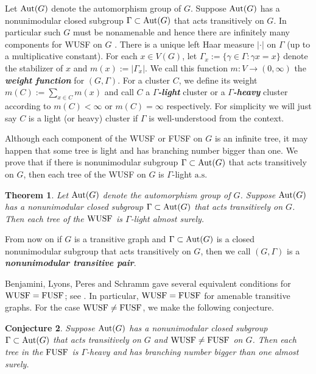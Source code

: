 \documentclass[12pt]{article}
\newtheorem{theorem}{Theorem}[section]
\newtheorem{conj}[theorem]{Conjecture}
\numberwithin{equation}{section}
\def\as {\mathrm{a.s.}}
\newcommand{\1}{\mathbf{1}}
\newcommand{\notion}[1]{{\bf  \textit{#1}}}
\begin{document}
 Let $\textnormal{Aut}(G)$ denote the automorphism group of $G$. Suppose $\textnormal{Aut}(G)$ has a nonunimodular closed subgroup $\Gamma\subset \textnormal{Aut}(G)$ that acts transitively on $G$. In particular such $G$ must be nonamenable \cite[Proposition 8.14]{LP2016} and hence there are infinitely many components for WUSF on $G$ \cite[Corollary 10.27]{LP2016}. There is a unique left Haar measure $|\cdot|$ on $\Gamma$ (up to a multiplicative constant). For each $x\in V(G)$, let $\Gamma_x:=\{\gamma\in\Gamma:\gamma x=x\}$ denote the stabilizer of $x$ and $m(x):=|\Gamma_x|$. We call this function $m: V\rightarrow(0,\infty)$ the \notion{weight function} for $(G,\Gamma)$. For a cluster $C$, we define its weight $m(C):=\sum_{x\in C}{m(x)}$ and call $C$ a \notion{$\Gamma$-light} cluster or a \notion{$\Gamma$-heavy} cluster according to $m(C)<\infty$ or $m(C)=\infty$ respectively. For simplicity we will just say $C$ is a light (or heavy) cluster if $\Gamma$ is well-understood from the context.
 
 
 Although each component of the WUSF or FUSF on $G$ is an infinite tree, it may happen that some tree is light and has branching number bigger than one. We prove that  if there is nonunimodular subgroup $\Gamma\subset \textnormal{Aut}(G)$ that acts transitively on $G$, then each tree of the WUSF on $G$ is $\Gamma$-light $\as$ 
 

 \begin{theorem}\label{thm:light for WUSF}
 	Let $\textnormal{Aut}(G)$ denote the automorphism group of $G$. Suppose $\textnormal{Aut}(G)$ has a nonunimodular closed subgroup $\Gamma\subset \textnormal{Aut}(G)$ that acts transitively on $G$. Then each tree of the $\textnormal{WUSF}$ is $\Gamma$-light almost surely. 
 \end{theorem}
 
 From now on if $G$ is a transitive graph and $\Gamma\subset \textnormal{Aut}(G)$ is a closed nonunimodular subgroup that acts transitively on $G$, then we call $(G,\Gamma)$ is a \notion{nonunimodular transitive pair}.

 
 
 Benjamini, Lyons,  Peres and  Schramm gave several equivalent conditions for $\textnormal{WUSF}=\textnormal{FUSF}$; see \cite[Theorem 7.3]{BLPS2001}. In particular, $\textnormal{WUSF}=\textnormal{FUSF}$ for amenable transitive graphs. For the case $\textnormal{WUSF}\neq\textnormal{FUSF}$, we make the following conjecture.
 
 \begin{conj}\label{conj: 1.2}
 	Suppose $\textnormal{Aut}(G)$ has a nonunimodular closed subgroup $\Gamma\subset \textnormal{Aut}(G)$ that acts transitively on $G$ and $\textnormal{WUSF}\neq\textnormal{FUSF}$ on $G$. Then each tree in the $\textnormal{FUSF}$ is $\Gamma$-heavy and has branching number bigger than one almost surely.
 \end{conj}
\end{document}
